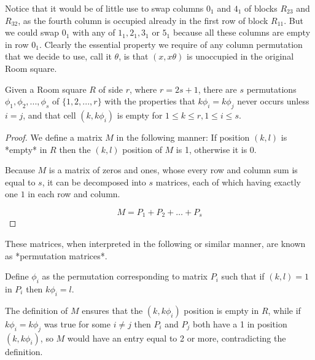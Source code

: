 Notice that it would be of little use to swap columns $0_1$ and $4_1$ of blocks $R_{23}$ and $R_{32}$, as the fourth column is occupied already in the first row of block $R_{11}$.
But we could swap $0_1$ with any of $1_1,2_1,3_1$ or $5_1$ because all these columns are empty in row $0_1$.
Clearly the essential property we require of any column permutation that we decide to use, call it $\theta$, is that $(x,x\theta)$ is unoccupied in the original Room square.

\begin{lemma}
\label{lem:permute}
Given a Room square $R$ of side $r$, where $r=2s+1$, there are $s$ permutations $\phi_1,\phi_2,...,\phi_s$ of $\{1,2,...,r\}$ with the properties that $k\phi_i=k\phi_j$ never occurs unless $i=j$, and that cell $(k,k\phi_i)$ is empty for $1 \leq k \leq r, 1 \leq i\leq s$.
\end{lemma}

\begin{proof}
We define a matrix $M$ in the following manner: If position $(k,l)$ is *empty* in $R$ then the $(k,l)$ position of $M$ is 1, otherwise it is 0.

Because $M$ is a matrix of zeros and ones, whose every row and column sum is equal to $s$, it can be decomposed into $s$ matrices, each of which having exactly one $1$ in each row and column.

\begin{equation}
M = P_1 + P_2 + \ldots + P_s
\end{equation}
\end{proof}

These matrices, when interpreted in the following or similar manner, are known as *permutation matrices*.

Define $\phi_i$ as the permutation corresponding to matrix $P_i$ such that if $(k,l) = 1$ in $P_i$ then $k\phi _i = l$.

The definition of $M$ ensures that the $(k, k\phi _i)$ position is empty in $R$, while if $k\phi_{i} = k\phi_{j}$ was true for some $i \neq j$ then $P_i$ and $P_j$ both have a 1 in position $(k, k\phi_i)$, so $M$ would have an entry equal to 2 or more, contradicting the definition.

